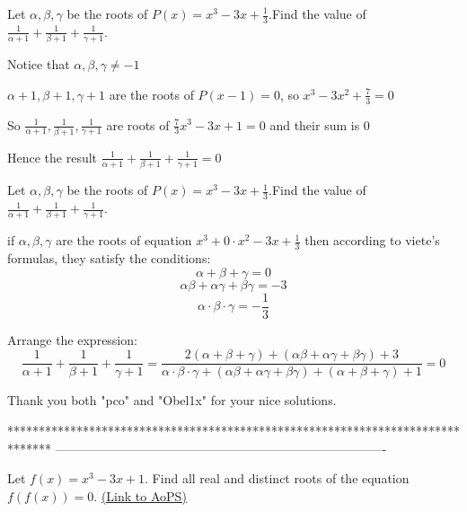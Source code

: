 \begin{solution}
	\begin{tcolorbox}Let $\alpha,\beta,\gamma$ be the roots of  $P(x)=x^3-3x+\frac13$.Find the value of $\frac{1}{\alpha+1}+\frac{1}{\beta+1}+\frac{1}{\gamma+1}$.\end{tcolorbox}
Notice that $\alpha,\beta,\gamma\ne -1$

$\alpha+1,\beta+1,\gamma+1$ are the roots of $P(x-1)=0$, so $x^3-3x^2+\frac 73=0$

So $\frac 1{\alpha +1},\frac 1{\beta+1},\frac 1{\gamma+1}$ are roots of $\frac 73x^3-3x+1=0$ and their sum is $0$

Hence the result $\boxed{\frac{1}{\alpha+1}+\frac{1}{\beta+1}+\frac{1}{\gamma+1}=0}$
\end{solution}



\begin{solution}
	\begin{tcolorbox}Let $\alpha,\beta,\gamma$ be the roots of  $P(x)=x^3-3x+\frac13$.Find the value of $\frac{1}{\alpha+1}+\frac{1}{\beta+1}+\frac{1}{\gamma+1}$.\end{tcolorbox}

if $ \alpha,\beta,\gamma$ are the roots of equation $x^3+0 \cdot x^2 -3x+\frac13$ then according to viete's formulas, they satisfy the conditions:
\[\alpha+\beta+\gamma=0\]
\[ \alpha  \beta +\alpha \gamma + \beta  \gamma=-3 \]
\[\alpha \cdot \beta \cdot \gamma=-\frac{1}{3}\]

Arrange the expression:
\[ \frac{1}{\alpha+1}+\frac{1}{\beta+1}+\frac{1}{\gamma+1}=\frac{2(\alpha+\beta+\gamma)+(\alpha  \beta +\alpha \gamma + \beta  \gamma)+3}{\alpha \cdot \beta \cdot \gamma+(\alpha  \beta +\alpha \gamma + \beta  \gamma)+(\alpha+\beta+\gamma)+1}=\boxed{0} \]
\end{solution}



\begin{solution}
	Thank you both "pco" and "Obel1x" for your nice solutions.
\end{solution}
*******************************************************************************
-------------------------------------------------------------------------------

\begin{problem}
	Let $f(x)=x^3-3x+1$. Find all real and distinct roots of the equation $f(f(x))=0$.
	\flushright \href{https://artofproblemsolving.com/community/c6h350922}{(Link to AoPS)}
\end{problem}



